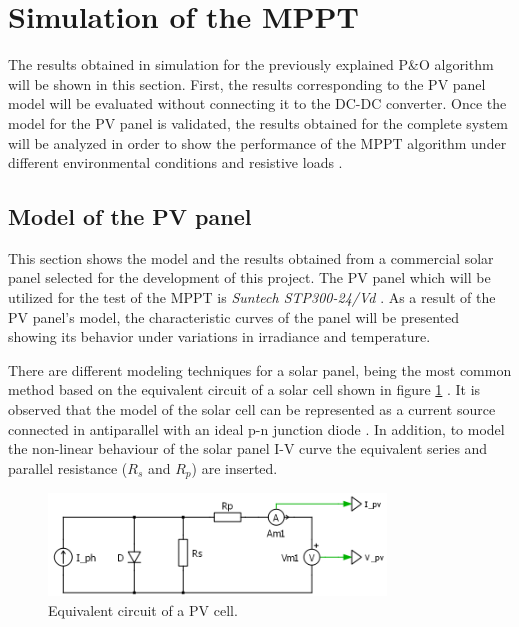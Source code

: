 
\section{Simulation of the MPPT} \label{MPPTSimulation}

The results obtained in simulation for the previously explained P\&O algorithm will be shown in this section. First, the results corresponding to the PV panel model will be evaluated without connecting it to the DC-DC converter. Once the model for the PV panel is validated, the results obtained for the complete system will be analyzed in order to show the performance of the MPPT algorithm under different environmental conditions and resistive loads .  

\subsection{Model of the PV panel}

This section shows the model and the results obtained from a commercial solar panel selected for the development of this project. The PV panel which will be utilized for the test of the MPPT is \textit{Suntech STP300-24/Vd} . As a result of the PV panel's model, the characteristic curves of the panel will be presented showing its behavior under variations in irradiance and temperature.

There are different modeling techniques for a solar panel, being the most common method based on the equivalent circuit of a solar cell shown in figure \ref{fig:eq_circuit_PVcell} . It is observed that the model of the solar cell can be represented as a current source connected in antiparallel with an ideal p-n junction diode . In addition, to model the non-linear behaviour of the solar panel I-V curve the equivalent series and parallel resistance ($R_{s}$ and $R_{p}$) are inserted.


\begin{figure}[H]
	\begin{center}
		\includegraphics[width=0.8\textwidth]{../Pictures/schematic_pv_cell}
		\caption{Equivalent circuit of a PV cell.}
		\label{fig:eq_circuit_PVcell} 
	\end{center}	
\end{figure}


